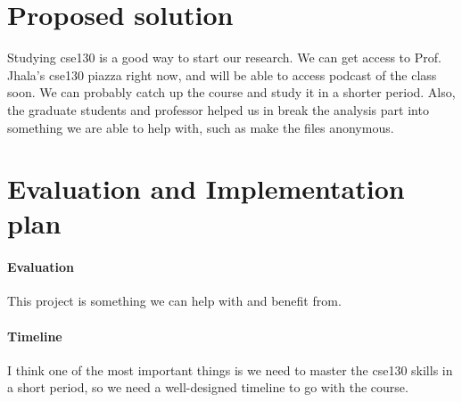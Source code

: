 \documentclass[dvips,12pt]{article}
\begin{document}
\section{Proposed solution}

Studying cse130 is a good way to start our research. We can get access to Prof. Jhala’s cse130 piazza right now, and will be able to access podcast of the class soon. We can probably catch up the course and study it in a shorter period. Also, the graduate students and professor helped us in break the analysis part into something we are able to help with, such as make the files anonymous. 

\section{Evaluation and Implementation plan}

\paragraph{Evaluation}
This project is something we can help with and benefit from. 


\paragraph{Timeline}
I think one of the most important things is we need to master the cse130 skills in a short period, so we need a well-designed timeline to go with the course. 
\end{document}
